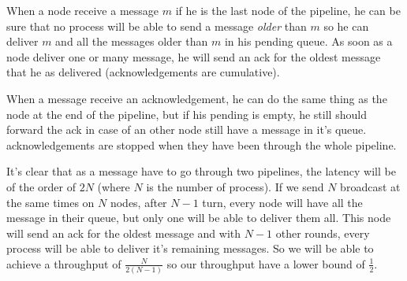 \documentclass[a4paper]{article}
\begin{document}
When a node receive a message $m$ if he is the last node of the pipeline, he can
be sure that no process will be able to send a message \textit{older} than $m$ so
he can deliver $m$ and all the messages older than $m$ in his pending queue. As
soon as a node deliver one or many message, he will send an ack for the oldest
message that he as delivered (acknowledgements are cumulative).

When a message receive an acknowledgement, he can do the same thing as the node at
the end of the pipeline, but if his pending is empty, he still should forward
the ack in case of an other node still have a message in it's queue.
acknowledgements are stopped when they have been through the whole pipeline.

It's clear that as a message have to go through two pipelines, the latency will
be of the order of $2N$ (where $N$ is the number of process). If we send $N$
broadcast at the same times on $N$ nodes, after $N-1$ turn, every node will have
all the message in their queue, but only one will be able to deliver them all.
This node will send an ack for the oldest message and with $N-1$ other rounds,
every process will be able to deliver it's remaining messages. So we will be
able to achieve a throughput of $\frac{N}{2(N-1)}$ so our throughput have a
lower bound of $\frac{1}{2}$.
\end{document}

